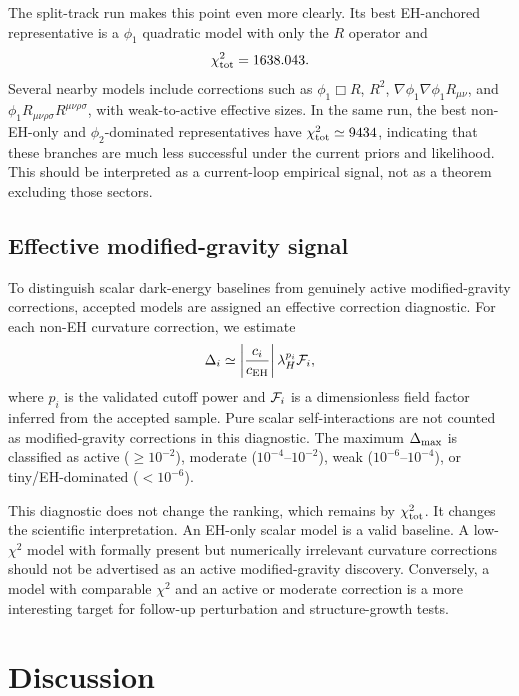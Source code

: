 \documentclass[aps,prd,twocolumn,superscriptaddress,nofootinbib,longbibliography]{revtex4-2}
\newcommand{\chiT}{\chi^2_{\rm tot}}
\begin{document}
The split-track run makes this point even more clearly.  Its best EH-anchored representative is a $\phi_1$ quadratic model with only the $R$ operator and
\begin{equation}
\chiT=1638.043.
\end{equation}
Several nearby models include corrections such as $\phi_1\Box R$, $R^2$, $\nabla\phi_1\nabla\phi_1R_{\mu\nu}$, and $\phi_1R_{\mu\nu\rho\sigma}R^{\mu\nu\rho\sigma}$, with weak-to-active effective sizes.  In the same run, the best non-EH-only and $\phi_2$-dominated representatives have $\chiT\simeq9434$, indicating that these branches are much less successful under the current priors and likelihood.  This should be interpreted as a current-loop empirical signal, not as a theorem excluding those sectors.

\subsection{Effective modified-gravity signal}
\label{subsec:effective-signal}

To distinguish scalar dark-energy baselines from genuinely active modified-gravity corrections, accepted models are assigned an effective correction diagnostic.  For each non-EH curvature correction, we estimate
\begin{equation}
\Delta_i\simeq
\left|\frac{c_i}{c_{\rm EH}}\right|
\lambda_H^{p_i}{\cal F}_i,
\label{eq:delta}
\end{equation}
where $p_i$ is the validated cutoff power and ${\cal F}_i$ is a dimensionless field factor inferred from the accepted sample.  Pure scalar self-interactions are not counted as modified-gravity corrections in this diagnostic.  The maximum $\Delta_{\rm max}$ is classified as active ($\ge10^{-2}$), moderate ($10^{-4}$--$10^{-2}$), weak ($10^{-6}$--$10^{-4}$), or tiny/EH-dominated ($<10^{-6}$).

This diagnostic does not change the ranking, which remains by $\chiT$.  It changes the scientific interpretation.  An EH-only scalar model is a valid baseline.  A low-$\chi^2$ model with formally present but numerically irrelevant curvature corrections should not be advertised as an active modified-gravity discovery.  Conversely, a model with comparable $\chi^2$ and an active or moderate correction is a more interesting target for follow-up perturbation and structure-growth tests.

\section{Discussion}
\label{sec:discussion}
\end{document}
